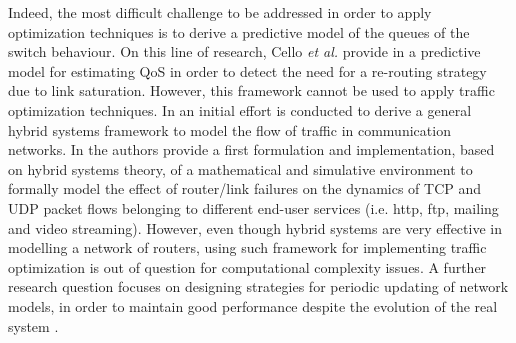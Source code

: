 Indeed, the most difficult challenge to be addressed in order to apply optimization techniques is to derive a predictive model of the queues of the switch behaviour. On this line of research, Cello \textit{et al.} provide in \cite{Cello2016} a predictive model for estimating QoS in order to detect the need for a re-routing strategy due to link saturation. However, this framework cannot be used to apply traffic optimization techniques. In \cite{LeeIEEEToN2007} an initial effort is conducted to derive a general hybrid systems framework to model the flow of traffic in communication networks. In \cite{DiBenedetto2014} the authors provide a first formulation and implementation, based on hybrid systems theory, of a mathematical and simulative environment to formally model the effect of router/link failures on the dynamics of TCP and UDP packet flows belonging to different end-user services (i.e. http, ftp, mailing and video streaming). However, even though hybrid systems are very effective in modelling a network of routers, using such framework for implementing traffic optimization is out of question for computational complexity issues. A further research question focuses on designing strategies for periodic updating of network models, in order to maintain good performance despite the evolution of the real system \cite{Mulinka2018}.

